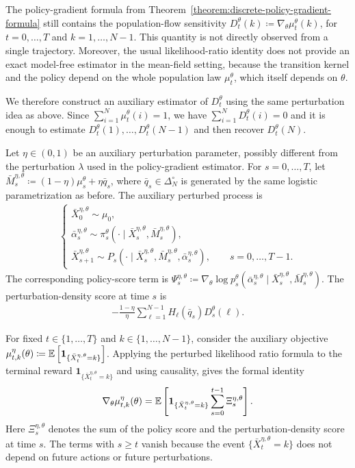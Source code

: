 The policy-gradient formula from Theorem~\ref{theorem:discrete-policy-gradient-formula} still contains the population-flow sensitivity $D_t^\theta(k)\coloneqq \nabla_\theta \mu_t^\theta(k)$, for $t=0,\ldots,T$ and $k=1,\ldots,N-1$. This quantity is not directly observed from a single trajectory. Moreover, the usual likelihood-ratio identity does not provide an exact model-free estimator in the mean-field setting, because the transition kernel and the policy depend on the whole population law $\mu_t^\theta$, which itself depends on $\theta$.

We therefore construct an auxiliary estimator of $D_t^\theta$ using the same perturbation idea as above. Since $\sum_{i=1}^N \mu_t^\theta(i) = 1$, we have $\sum_{i=1}^N D_t^\theta(i) = 0$ and it is enough to estimate $D_t^\theta(1),\ldots, D_t^\theta(N-1)$ and then recover $D_t^\theta(N)$.

Let $\eta\in(0,1)$ be an auxiliary perturbation parameter, possibly different from the perturbation $\lambda$ used in the policy-gradient estimator. For $s=0,\ldots,T$, let $\bar M_s^{\eta,\theta} \coloneqq (1-\eta)\mu_s^\theta + \eta \bar q_s$, where $\bar q_s\in\Delta_N^\circ$ is generated by the same logistic parametrization as before. The auxiliary perturbed process is
\begin{align}
    \begin{cases}
        \bar{X}_0^{\eta, \theta} \sim \mu_0, \\
        \bar{\alpha}_s^{\eta, \theta} \sim \pi_s^\theta(\cdot \mid \bar{X}_s^{\eta, \theta}, \bar{M}_s^{\eta, \theta}), \\
        \bar{X}_{s+1}^{\eta, \theta} \sim P_s(\cdot \mid \bar{X}_s^{\eta, \theta}, \bar{M}_s^{\eta, \theta}, \bar\alpha_s^{\eta, \theta}), \qquad s=0,\ldots, T-1.
    \end{cases}
\end{align}
The corresponding policy-score term is $\Psi_s^{\eta, \theta} \coloneqq \nabla_\theta \log p_s^\theta (\bar\alpha_s^{\eta, \theta} \mid \bar X_s^{\eta, \theta}, \bar M_s^{\eta, \theta})$. The perturbation-density score at time $s$ is
\begin{align}
    -\frac{1-\eta}{\eta} \sum_{\ell=1}^{N-1}H_\ell(\bar q_s)D_s^\theta(\ell).
\end{align}

For fixed $t\in\{1,\ldots,T\}$ and $k\in\{1,\ldots,N-1\}$, consider the auxiliary objective $\mu_{t,k}^\eta(\theta) \coloneqq \mathbb{E}\left[\mathbf 1_{\{\bar X_t^{\eta,\theta}=k \}} \right]$. Applying the perturbed likelihood ratio formula to the terminal reward $\mathbf 1_{\{\bar X_t^{\eta,\theta}=k \}}$ and using causality, gives the formal identity
\begin{align}
    \nabla_\theta \mu_{t,k}^\eta(\theta) = \mathbb{E} \left[ \mathbf{1}_{\{\bar X_t^{\eta, \theta}=k\}} \sum_{s=0}^{t-1}\Xi_s^{\eta, \theta} \right].
\end{align}
Here $\Xi_s^{\eta,\theta}$ denotes the sum of the policy score and the perturbation-density score at time $s$.
The terms with $s\geq t$ vanish because the event $\{\bar X_t^{\eta, \theta}=k\}$ does not depend on future actions or future perturbations.

